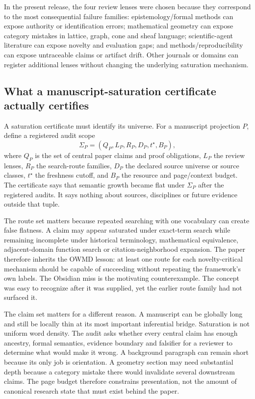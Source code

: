 In the present release, the four review lenses were chosen because they correspond to the most consequential failure families: epistemology/formal methods can expose authority or identification errors; mathematical geometry can expose category mistakes in lattice, graph, cone and sheaf language; scientific-agent literature can expose novelty and evaluation gaps; and methods/reproducibility can expose untraceable claims or artifact drift. Other journals or domains can register additional lenses without changing the underlying saturation mechanism.

\subsection{What a manuscript-saturation certificate actually certifies}

A saturation certificate must identify its universe. For a manuscript projection \(P\), define a registered audit scope
\[
\Sigma_P=(Q_P,L_P,R_P,D_P,t^\star,B_P),
\]
where \(Q_P\) is the set of central paper claims and proof obligations, \(L_P\) the review lenses, \(R_P\) the search-route families, \(D_P\) the declared source universe or source classes, \(t^\star\) the freshness cutoff, and \(B_P\) the resource and page/context budget. The certificate says that semantic growth became flat under \(\Sigma_P\) after the registered audits. It says nothing about sources, disciplines or future evidence outside that tuple.

The route set matters because repeated searching with one vocabulary can create false flatness. A claim may appear saturated under exact-term search while remaining incomplete under historical terminology, mathematical equivalence, adjacent-domain function search or citation-neighborhood expansion. The paper therefore inherits the OWMD lesson: at least one route for each novelty-critical mechanism should be capable of succeeding without repeating the framework's own labels. The Obsidian miss is the motivating counterexample. The concept was easy to recognize after it was supplied, yet the earlier route family had not surfaced it.

The claim set matters for a different reason. A manuscript can be globally long and still be locally thin at its most important inferential bridge. Saturation is not uniform word density. The audit asks whether every central claim has enough ancestry, formal semantics, evidence boundary and falsifier for a reviewer to determine what would make it wrong. A background paragraph can remain short because its only job is orientation. A geometry section may need substantial depth because a category mistake there would invalidate several downstream claims. The page budget therefore constrains presentation, not the amount of canonical research state that must exist behind the paper.

